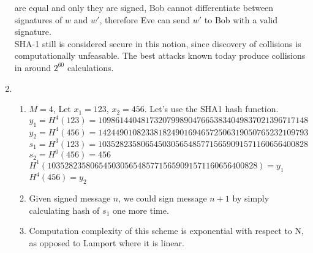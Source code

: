 \documentclass[a4paper,10pt]{extarticle}
\begin{document}
\begin{enumerate}
    are equal and only they are signed, Bob cannot differentiate between signatures of $w$ and $w'$, therefore Eve can send $w'$
    to Bob with a valid signature.\\
    SHA-1 still is considered secure in this notion, since discovery of collisions is computationally unfeasable. The best
    attacks known today produce collisions in around $2^{60}$ calculations.
  \item
    \begin{enumerate}
      \item
        $M=4$, Let $x_1=123$, $x_2=456$. Let's use the SHA1 hash function.\\
        $y_1=H^4(123)=1098614404817320799890476653834049837021396717148$\\
        $y_2=H^4(456)=1424490108233818249016946572506319050765232109793$\\
        $s_1=H^3(123)=1035282358065450305654857715659091571160656400828$\\
        $s_2=H^0(456)=456$\\
        $H^1(1035282358065450305654857715659091571160656400828)=y_1$\\
        $H^4(456)=y_2$
      \item
        Given signed message $n$, we could sign message $n+1$ by simply calculating hash of $s_1$ one more time.
      \item
        Computation complexity of this scheme is exponential with respect to N, as opposed to {Lamport} where it is linear.
    \end{enumerate}

    
\end{enumerate}
\end{document}
